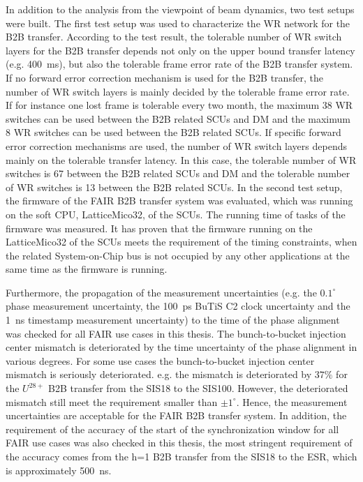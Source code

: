 In addition to the analysis from the viewpoint of beam dynamics, two test setups were built. The first test setup was used to characterize the WR network for the B2B transfer. According to the test result, the tolerable number of WR switch layers for the B2B transfer depends not only on the upper bound transfer latency (e.g. \SI{400}{\ms}), but also the tolerable frame error rate of the B2B transfer system. If no forward error correction mechanism is used for the B2B transfer, the number of WR switch layers is mainly decided by the tolerable frame error rate. If for instance one lost frame is tolerable every two month, the maximum 38 WR switches can be used between the B2B related SCUs and DM and the maximum 8 WR switches can be used between the B2B related SCUs. If specific forward error correction mechanisms are used, the number of WR switch layers depends mainly on the tolerable transfer latency. In this case, the tolerable number of WR switches is 67 between the B2B related SCUs and DM and the tolerable number of WR switches is 13 between the B2B related SCUs. In the second test setup, the firmware of the FAIR B2B transfer system was evaluated, which was running on the soft CPU, LatticeMico32, of the SCUs. The running time of tasks of the firmware was measured. It has proven that the firmware running on the LatticeMico32 of the SCUs meets the requirement of the timing constraints, when the related System-on-Chip bus is not occupied by any other applications at the same time as the firmware is running.

Furthermore, the propagation of the measurement uncertainties (e.g. the $0.1^\circ$ phase measurement uncertainty, the \SI{100}{ps} BuTiS C2 clock uncertainty and the \SI{1}{ns} timestamp measurement uncertainty) to the time of the phase alignment was checked for all FAIR use cases in this thesis. The bunch-to-bucket injection center mismatch is deteriorated by the time uncertainty of the phase alignment in various degrees. For some use cases the bunch-to-bucket injection center mismatch is seriously deteriorated. e.g. the mismatch is deteriorated by $37\%$ for the $U^\mathit{28+}$ B2B transfer from the SIS18 to the SIS100. However, the deteriorated mismatch still meet the requirement smaller than $\pm1^\circ$. Hence, the measurement uncertainties are acceptable for the FAIR B2B transfer system. In addition, the requirement of the accuracy of the start of the synchronization window for all FAIR use cases was also checked in this thesis, the most stringent requirement of the accuracy comes from the h=1 B2B transfer from the SIS18 to the ESR, which is approximately \SI{500}{\ns}. 

